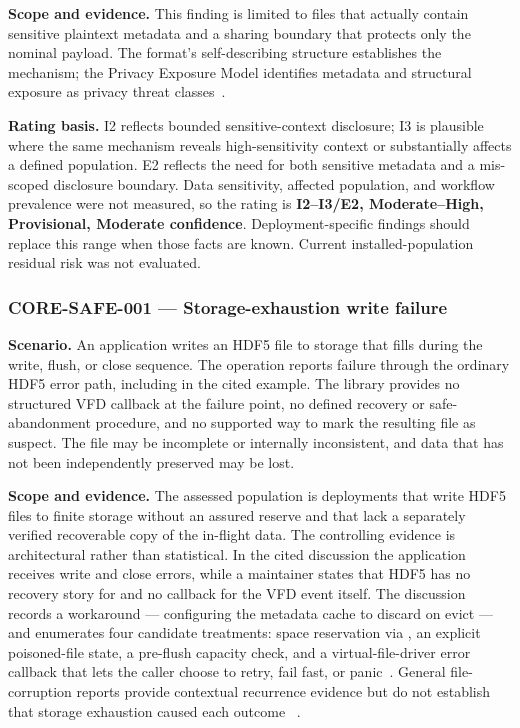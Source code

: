 \documentclass[../main.tex]{subfiles}
\begin{document}
\noindent\textbf{Scope and evidence.}
This finding is limited to files that actually contain sensitive plaintext
metadata and a sharing boundary that protects only the nominal payload. The
format's self-describing structure establishes the mechanism; the Privacy
Exposure Model identifies metadata and structural exposure as privacy threat
classes~\cite{hdf5-data-model,hdf5-privacy-exposure-model}.

\noindent\textbf{Rating basis.}
I2 reflects bounded sensitive-context disclosure; I3 is plausible where the
same mechanism reveals high-sensitivity context or substantially affects a
defined population. E2 reflects the need for both sensitive metadata and a
mis-scoped disclosure boundary. Data sensitivity, affected population, and
workflow prevalence were not measured, so the rating is
\textbf{I2--I3/E2, Moderate--High, Provisional, Moderate confidence}.
Deployment-specific findings should replace this range when those facts are
known. Current installed-population residual risk was not evaluated.

\subsubsection*{CORE-SAFE-001 --- Storage-exhaustion write failure}

\noindent\textbf{Scenario.}
An application writes an HDF5 file to storage that fills during the write,
flush, or close sequence. The operation reports failure through the ordinary
HDF5 error path, including  in the cited example. The library
provides no structured VFD callback at the failure point, no defined recovery
or safe-abandonment procedure, and no supported way to mark the resulting file
as suspect. The file may be incomplete or internally inconsistent, and data
that has not been independently preserved may be lost.

\noindent\textbf{Scope and evidence.}
The assessed population is deployments that write HDF5 files to finite storage
without an assured reserve and that lack a separately verified recoverable copy
of the in-flight data. The controlling evidence is architectural rather than
statistical. In the cited discussion the application receives write and close
errors, while a maintainer states that HDF5 has no recovery story for
 and no callback for the VFD event itself. The discussion records
a workaround --- configuring the metadata cache to discard on evict --- and
enumerates four candidate treatments: space reservation via
, an explicit poisoned-file state, a pre-flush capacity
check, and a virtual-file-driver error callback that lets the caller choose to
retry, fail fast, or panic~\cite{forum-enospc-11714}. General file-corruption
reports provide contextual recurrence evidence but do not establish that
storage exhaustion caused each outcome
~\cite{forum-recover-1146,forum-recover-5441}.
\end{document}
